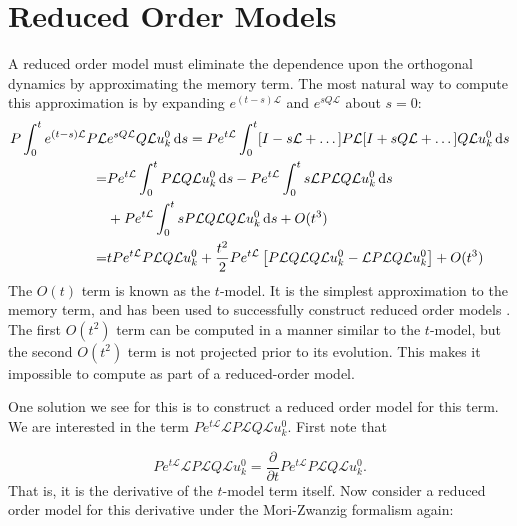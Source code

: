 \documentclass{article}
\begin{document}
\section{Reduced Order Models}

A reduced order model must eliminate the dependence upon the orthogonal dynamics by approximating the memory term. The most natural way to compute this approximation is by expanding $e^{(t-s)\mathcal{L}}$ and $e^{sQ\mathcal{L}}$ about $s=0$:
\begin{align}
P\int_0^te^{(t-s)\mathcal{L}}P\mathcal{L}&e^{sQ\mathcal{L}}Q\mathcal{L}u_k^0\,\mathrm{d}s=Pe^{t\mathcal{L}}\int_0^t [I-s\mathcal{L}+\dots]P\mathcal{L}[I+sQ\mathcal{L}+\dots]Q\mathcal{L}u_k^0\,\mathrm{d}s\notag\\
=&Pe^{t\mathcal{L}}\int_0^t P\mathcal{L}Q\mathcal{L}u_k^0\,\mathrm{d}s-Pe^{t\mathcal{L}}\int_0^t s\mathcal{L}P\mathcal{L}Q\mathcal{L}u_k^0\,\mathrm{d}s\notag\\
& +Pe^{t\mathcal{L}}\int_0^t sP\mathcal{L}Q\mathcal{L}Q\mathcal{L}u_k^0\,\mathrm{d}s+O(t^3)\notag\\
=&tPe^{t\mathcal{L}}P\mathcal{L}Q\mathcal{L}u_k^0+\frac{t^2}{2}Pe^{t\mathcal{L}}\left[P\mathcal{L}Q\mathcal{L}Q\mathcal{L}u_k^0-\mathcal{L}P\mathcal{L}Q\mathcal{L}u_k^0\right]+O(t^3)\label{t model}
\end{align}
The $O(t)$ term is known as the $t$-model. It is the simplest approximation to the memory term, and has been used to successfully construct reduced order models \cite{stinis2013renormalized,chorin2002optimal,stinis2015renormalized,stinis2012numerical,stinis2012mori1,stinis2012mori2,chorin2007problem,hald2007optimal,stinis2007higher,bernstein2007optimal,chandy2009t}. The first $O(t^2)$ term can be computed in a manner similar to the $t$-model, but the second $O(t^2)$ term is not projected prior to its evolution. This makes it impossible to compute as part of a reduced-order model.

One solution we see for this is to construct a reduced order model for this term. We are interested in the term $Pe^{t\mathcal{L}}\mathcal{L}P\mathcal{L}Q\mathcal{L}u_k^0$. First note that

\begin{equation}
Pe^{t\mathcal{L}}\mathcal{L}P\mathcal{L}Q\mathcal{L}u_k^0=\frac{\partial}{\partial t} Pe^{t\mathcal{L}}P\mathcal{L}Q\mathcal{L}u_k^0.
\end{equation}That is, it is the derivative of the $t$-model term itself. Now consider a reduced order model for this derivative under the Mori-Zwanzig formalism again:
\end{document}
